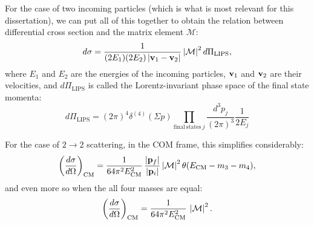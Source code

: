 For the case of two incoming particles (which is what is most relevant for this dissertation), we can put all of this together to obtain the relation between differential cross section and the matrix element $\mathcal M$:
\begin{equation}
	\label{eq:01_qft_interactions_cross_section_matrix_element}
	d\sigma = \frac{1}{(2E_1)(2E_2)\left\lvert \mathbf{v}_1 - \mathbf{v}_2 \right\rvert} \left\lvert \mathcal M \right\rvert^2 d\Pi_\mathrm{LIPS},
\end{equation}
where $E_1$ and $E_2$ are the energies of the incoming particles, $\mathbf{v}_1$ and $\mathbf{v}_2$ are their velocities, and $d\Pi_\mathrm{LIPS}$ is called the Lorentz-invariant phase space of the final state momenta:
\begin{equation}
	\label{eq:01_qft_interactions_cross_section_lips}
	d\Pi_\mathrm{LIPS} = (2\pi)^4 \delta^{(4)}(\Sigma p) \prod_{\mathrm{final\ states}\ j} \frac{d^3p_j}{(2\pi)^3} \frac{1}{2E_j}
\end{equation}

For the case of $2 \rightarrow 2$ scattering, in the COM frame, this simplifies considerably:
\begin{equation}
	\label{eq:01_qft_interactions_cross_section_com}
	\bigg(\frac{d\sigma}{d\Omega}\bigg)_\mathrm{CM} = \frac{1}{64\pi^2E_\mathrm{CM}^2}\, \frac{\left\lvert \mathbf{p}_f \right\rvert}{\left\lvert \mathbf{p}_i \right\rvert} \left\lvert \mathcal M \right\rvert^2 \theta(E_\mathrm{CM} - m_3 - m_4),
\end{equation}
and even more so when the all four masses are equal:
\begin{equation}
	\label{eq:01_qft_interactions_cross_section_com_equal_mass}
	\bigg(\frac{d\sigma}{d\Omega}\bigg)_\mathrm{CM} = \frac{1}{64\pi^2E_\mathrm{CM}^2}\, \left\lvert \mathcal M \right\rvert^2.
\end{equation}


